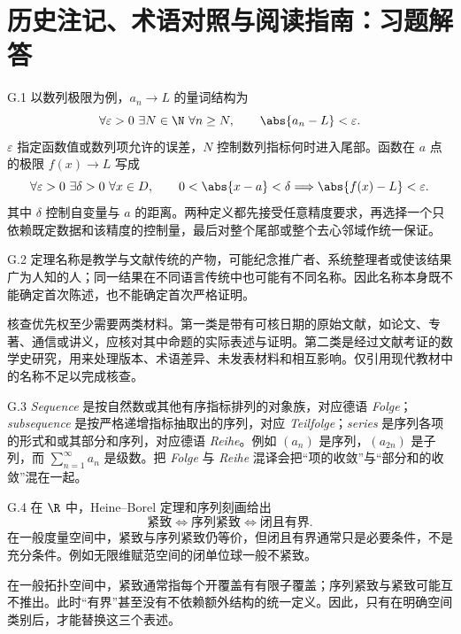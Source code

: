 \chapter{历史注记、术语对照与阅读指南：习题解答}

\begin{solution}{G.1}
以数列极限为例，$a_n\to L$ 的量词结构为
\[
 \forall\varepsilon>0\ \exists N\in\N\ \forall n\ge N,
 \qquad \abs{a_n-L}<\varepsilon.
\]
$\varepsilon$ 指定函数值或数列项允许的误差，$N$ 控制数列指标何时进入尾部。函数在 $a$ 点的极限 $f(x)\to L$ 写成
\[
 \forall\varepsilon>0\ \exists\delta>0\ \forall x\in D,
 \qquad 0<\abs{x-a}<\delta\Longrightarrow\abs{f(x)-L}<\varepsilon.
\]
其中 $\delta$ 控制自变量与 $a$ 的距离。两种定义都先接受任意精度要求，再选择一个只依赖既定数据和该精度的控制量，最后对整个尾部或整个去心邻域作统一保证。
\end{solution}

\begin{solution}{G.2}
定理名称是教学与文献传统的产物，可能纪念推广者、系统整理者或使该结果广为人知的人；同一结果在不同语言传统中也可能有不同名称。因此名称本身既不能确定首次陈述，也不能确定首次严格证明。

核查优先权至少需要两类材料。第一类是带有可核日期的原始文献，如论文、专著、通信或讲义，应核对其中命题的实际表述与证明。第二类是经过文献考证的数学史研究，用来处理版本、术语差异、未发表材料和相互影响。仅引用现代教材中的名称不足以完成核查。
\end{solution}

\begin{solution}{G.3}
\emph{Sequence} 是按自然数或其他有序指标排列的对象族，对应德语 \emph{Folge}；\emph{subsequence} 是按严格递增指标抽取出的序列，对应 \emph{Teilfolge}；\emph{series} 是序列各项的形式和或其部分和序列，对应德语 \emph{Reihe}。例如 $(a_n)$ 是序列，$(a_{2n})$ 是子列，而 $\sum_{n=1}^{\infty}a_n$ 是级数。把 \emph{Folge} 与 \emph{Reihe} 混译会把“项的收敛”与“部分和的收敛”混在一起。
\end{solution}

\begin{solution}{G.4}
在 $\R$ 中，Heine--Borel 定理和序列刻画给出
\[
 \text{紧致}\Longleftrightarrow\text{序列紧致}
 \Longleftrightarrow\text{闭且有界}.
\]
在一般度量空间中，紧致与序列紧致仍等价，但闭且有界通常只是必要条件，不是充分条件。例如无限维赋范空间的闭单位球一般不紧致。

在一般拓扑空间中，紧致通常指每个开覆盖有有限子覆盖；序列紧致与紧致可能互不推出。此时“有界”甚至没有不依赖额外结构的统一定义。因此，只有在明确空间类别后，才能替换这三个表述。
\end{solution}

